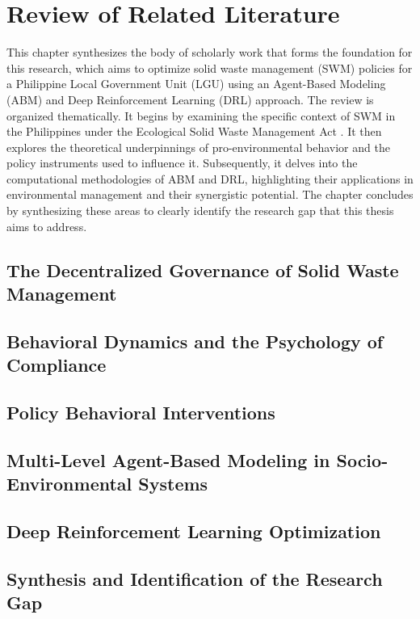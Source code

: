 \chapter{Review of Related Literature}

This chapter synthesizes the body of scholarly work that forms the foundation for this research, which aims to optimize solid waste management (SWM) policies for a Philippine Local Government Unit (LGU) using an Agent-Based Modeling (ABM) and Deep Reinforcement Learning (DRL) approach. The review is organized thematically. It begins by examining the specific context of SWM in the Philippines under the Ecological Solid Waste Management Act \citep{RA9003}. It then explores the theoretical underpinnings of pro-environmental behavior and the policy instruments used to influence it. Subsequently, it delves into the computational methodologies of ABM and DRL, highlighting their applications in environmental management and their synergistic potential. The chapter concludes by synthesizing these areas to clearly identify the research gap that this thesis aims to address.
\section{The Decentralized Governance of Solid Waste Management}
\setlength{\parindent}{2em}


\section{Behavioral Dynamics and the Psychology of Compliance}
\setlength{\parindent}{2em}


\section{Policy Behavioral Interventions}
\setlength{\parindent}{2em}


\section{Multi-Level Agent-Based Modeling in Socio-Environmental Systems}
\setlength{\parindent}{2em}


\section{Deep Reinforcement Learning Optimization}
\setlength{\parindent}{2em}
\label{sec:drl_optimization}


\section{Synthesis and Identification of the Research Gap}
\setlength{\parindent}{2em}
